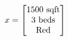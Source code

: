 \documentclass[preview]{standalone}
\begin{document}
\begin{align*}
\special{dvisvgm:raw <g id='unique000'>}x = \begin{bmatrix} 1500 \text{ sqft} \\ 3 \text{ beds} \\ \text{Red} \end{bmatrix}\special{dvisvgm:raw </g>}
\end{align*}
\end{document}

